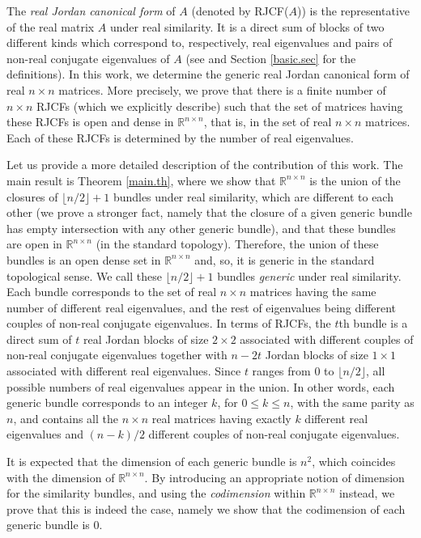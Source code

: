 \documentclass[a4paper]{article}
\newcommand{\R}{\mathbb R}
\begin{document}
The {\em real Jordan canonical form} of $A$ (denoted by RJCF($A$)) is the representative of the real matrix $A$ under real similarity. It is a direct sum of blocks of two different kinds which correspond to, respectively, real eigenvalues and pairs of non-real conjugate eigenvalues of $A$ (see \cite[Th. 3.4.1.5]{hj13} and Section \ref{basic.sec} for the definitions). In this work, we determine the generic real Jordan canonical form of real $n\times n$ matrices. More precisely, we prove that there is a finite number of $n\times n$ RJCFs (which we explicitly describe) such that the set of matrices having these RJCFs is open and dense in $\R^{n\times n}$, that is, in the set of real $n\times n$ matrices. Each of these RJCFs is determined by the number of real eigenvalues.

Let us provide a more detailed description of the contribution of this work. The main result is Theorem \ref{main.th}, where we show that $\R^{n\times n}$ is the union of the closures of $\lfloor n/2\rfloor+1$ bundles under real similarity, which are different to each other (we prove a stronger fact, namely that the closure of a given generic bundle has empty intersection with any other generic bundle), and that these bundles are open in $\R^{n\times n}$ (in the standard topology). Therefore, the union of these bundles is an open dense set in $\R^{n\times n}$ and, so, it is generic in the standard topological sense. We call these $\lfloor n/2\rfloor+1$ bundles {\it generic} under real similarity. Each bundle corresponds to the set of real $n\times n$ matrices having the same number of different real eigenvalues, and the rest of eigenvalues being different couples of non-real conjugate eigenvalues. In terms of RJCFs, the $t$th bundle is a direct sum of $t$ real Jordan blocks of size $2\times 2$ associated with different couples of non-real conjugate eigenvalues together with $n-2t$ Jordan blocks of size $1\times 1$ associated with different real eigenvalues. Since $t$ ranges from $0$ to $\lfloor n/2\rfloor$, all possible numbers of real eigenvalues appear in the union. In other words, each generic bundle corresponds to an integer $k$, for $0 \leq k\leq n$, with the same parity as $n$, and contains all the $n\times n$ real matrices having exactly $k$ different real eigenvalues and $(n-k)/2$ different couples of non-real conjugate eigenvalues.

It is expected that the dimension of each generic bundle is $n^2$, which coincides with the dimension of $\R^{n\times n}$. By introducing an appropriate notion of dimension for the similarity bundles, and using the {\em codimension} within $\R^{n\times n}$ instead, we prove that this is indeed the case, namely we show that the codimension of each generic bundle is $0$.
\end{document}
